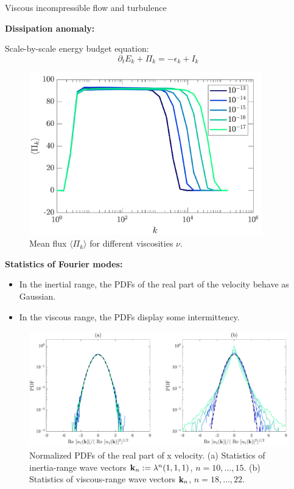 \documentclass{beamer} %
\begin{document}
\begin{frame}{Viscous incompressible flow and turbulence}
  \begin{minipage}[t]{0.37\textwidth}
    \textbf{Dissipation anomaly:}

    Scale-by-scale energy budget equation:
    $$
      \partial_t E_k + \Pi_k = -\epsilon_k + I_k
    $$
    \begin{figure}
      \centering
      \includegraphics[width=0.9\textwidth]{images/viscous-1.png}
      \caption{Mean flux $\langle \Pi_k\rangle$ for different viscosities $\nu$. \cite{campolina}}
    \end{figure}
  \end{minipage}\hspace{5pt}\textcolor{\mycolor}{\vrule}\hspace{5pt}
  \begin{minipage}[t]{0.57\textwidth}
    \textbf{Statistics of Fourier modes:}
    \begin{itemize}
      \item In the inertial range, the PDFs of the real part of the velocity behave as Gaussian.
      \item In the viscous range, the PDFs display some intermittency.
    \end{itemize}
    \begin{figure}
      \centering
      \includegraphics[width=\textwidth]{images/viscous-2.png}
      \caption{Normalized PDFs of the real part of x velocity. (a) Statistics of inertia-range wave vectors $\boldsymbol{\mathrm{k}}_n:=\lambda^n(1,1,1)$, $n=10,...,15$. (b) Statistics of viscous-range wave vectors $\boldsymbol{\mathrm{k}}_n$, $n=18,...,22$. \cite{campolina}}
    \end{figure}
  \end{minipage}
\end{frame}
\end{document}
